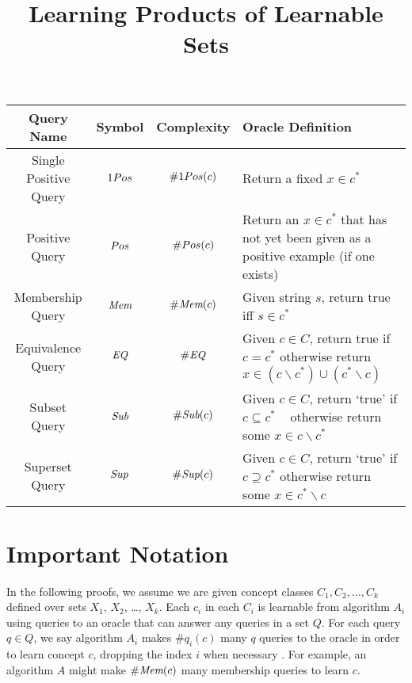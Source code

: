 \documentclass[11pt]{amsart}
\title{Learning Products of Learnable Sets}
\author{}
\begin{document}
\maketitle

\begin{table}
\begin{center}
  \begin{tabularx}{\textwidth}{| c | c | c | X | }
    \hline
    Query Name & Symbol & Complexity & Oracle Definition \\ \hline
    Single Positive Query & $\oneposQ$ & $\oneposC(c)$ & Return a fixed $x \in c^*$ \\ \hline
    Positive Query & $Pos$ & $\#Pos(c)$ & Return an $x\in c^*$ that has not yet been given as a positive example (if one exists)\\ \hline
    Membership Query & $\emph{Mem}$ & $\#\emph{Mem}(c)$ & Given string $s$, return true iff $s \in c^*$ \\ \hline
    Equivalence Query & $\emph{EQ}$ & $\#\emph{EQ}$ & Given $c \in C$, return true if $c=c^*$ otherwise return $x \in (c \backslash c^*) \cup (c^* \backslash c)$\\ \hline 
    Subset Query & $\emph{Sub}$ & $\#\emph{Sub}(c)$ & Given $c \in C$, return `true' if $c \subseteq c^*$ \mbox{  } otherwise return some $x \in c \backslash c^*$ \\ \hline
    Superset Query & $\emph{Sup}$ & $\#\emph{Sup}(c)$ & Given $c \in C$, return `true' if $c \supseteq c^*$  otherwise return some $x \in c^* \backslash c$\\ \hline
  \end{tabularx}
\end{center}
\end{table}

\section{Important Notation}

In the following proofs, we assume we are given concept classes $C_1, C_2, \dots, C_k$ defined over sets $X_1$, $X_2$, \dots, $X_k$. 
Each $c_i$ in each $C_i$ is learnable from algorithm $A_i$ using queries to an oracle that can answer any queries in a set $Q$. 
For each query $q \in Q$, we say algorithm $A_i$ makes $\#q_i(c)$ many $q$ queries to the oracle in order to learn concept $c$, dropping the index $i$ when necessary .
For example, an algorithm $A$ might make $\#\emph{Mem}(c)$ many membership queries to learn $c$. 
\end{document}
